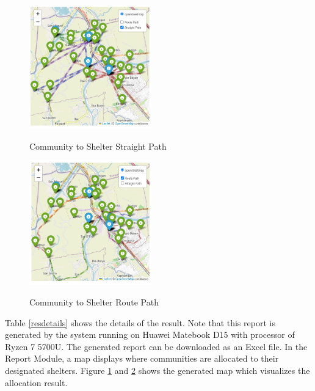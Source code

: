 \documentclass[12pt,a4paper,]{article}
\begin{document}
	\begin{table}[h]
		\centering
		\caption{Result Details}
		\label{resdetails}
	\end{table}
	
	\begin{figure}[h!]
		\caption{Community to Shelter Straight Path}
		\centering
		\includegraphics[width=200px]{Chapter 4/straight path}
		\label{straightpath}
	\end{figure}
	
	\begin{figure}[h!]
		\caption{Community to Shelter Route Path}
		\centering
		\includegraphics[width=200px]{Chapter 4/route path}
		\label{routepath}
	\end{figure}
	
	Table \ref{resdetails} shows the details of the result. Note that this report is generated by the system running on Huawei Matebook D15 with processor of Ryzen 7 5700U. The generated report can be downloaded as an Excel file. In the Report Module, a map displays where communities are allocated to their designated shelters. Figure \ref{straightpath} and \ref{routepath} shows the generated map which visualizes the allocation result.
	
\end{document}
